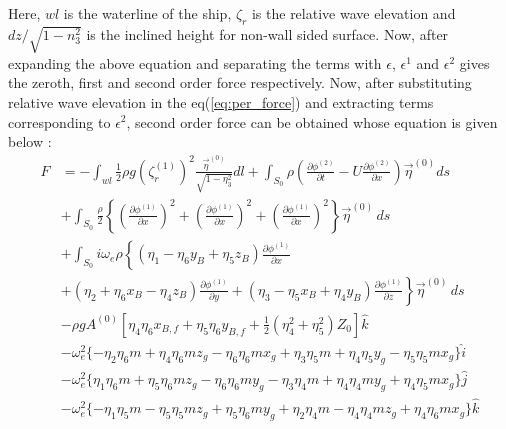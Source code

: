 Here, $wl$ is the waterline of the ship, $\zeta_r$ is the relative wave elevation and $dz/\sqrt{1-n^2_3}$ is the inclined height for 
non-wall sided surface. Now, after expanding the above equation and separating the terms with 
$\epsilon$, $\epsilon^1$ and $\epsilon^2$ gives the zeroth, first and second order force respectively.
Now, after substituting relative wave elevation in the eq(\ref{eq:per_force}) and extracting terms corresponding
to $\epsilon^2$, second order force can be obtained whose equation is given below :
\begin{align}     
    F &= -\int_{wl}\frac{1}{2}\rho g (\zeta_r^{(1)})^2 \frac{\vec{\eta}^{(0)}}{\sqrt{1-\eta_3^2}} dl + 
    \int_{S_0}\rho\left(\frac{\partial \phi^{(2)}}{\partial t} - U\frac{\partial \phi^{(2)}}{\partial x}\right)\vec{\eta}^{(0)}ds \\ \nonumber
    &+ \int_{S_0} \frac{\rho}{2}\left\{\left(\frac{\partial \phi^{(1)}}{\partial x}\right)^2 + \left(\frac{\partial \phi^{(1)}}{\partial x}\right)^2
    + \left(\frac{\partial \phi^{(1)}}{\partial x}\right)^2\right\}\vec{\eta}^{(0)} \,ds \\ \nonumber
    &+\int_{S_0}i\omega_e\rho\left\{(\eta_1-\eta_6y_B+\eta_5z_B)\frac{\partial \phi^{(1)}}{\partial x} \right. \\ \nonumber
    &\left. +(\eta_2+\eta_6x_B-\eta_4z_B)\frac{\partial \phi^{(1)}}{\partial y} + (\eta_3-\eta_5x_B+\eta_4y_B)
    \frac{\partial \phi^{(1)}}{\partial z}\right\}\vec{\eta}^{(0)} \,ds \\ \nonumber
    &- \rho g A^{(0)}\left[\eta_4 \eta_6 x_{B,f} + \eta_5\eta_6 y_{B,f} + \frac{1}{2}(\eta_4^2+\eta_5^2)Z_0\right]\hat{k} \\ \nonumber
    &-\omega^2_e\{-\eta_2\eta_6m + \eta_4\eta_6m z_g -\eta_6\eta_6 m x_g + \eta_3 \eta_5 m + \eta_4\eta_5y_g
    - \eta_5\eta_5 m x_g\} \hat{i} \\ \nonumber
    &-\omega^2_e\{\eta_1\eta_6m + \eta_5\eta_6m z_g -\eta_6\eta_6 m y_g - \eta_3 \eta_4 m + \eta_4 \eta_4 m y_g
    + \eta_4 \eta_5 m x_g\} \hat{j} \\ \nonumber
    &-\omega^2_e\{-\eta_1\eta_5 m - \eta_5\eta_5m z_g +\eta_5\eta_6 m y_g + \eta_2 \eta_4 m - \eta_4 \eta_4 m z_g
    + \eta_4 \eta_6 m x_g\} \hat{k}
\end{align}

